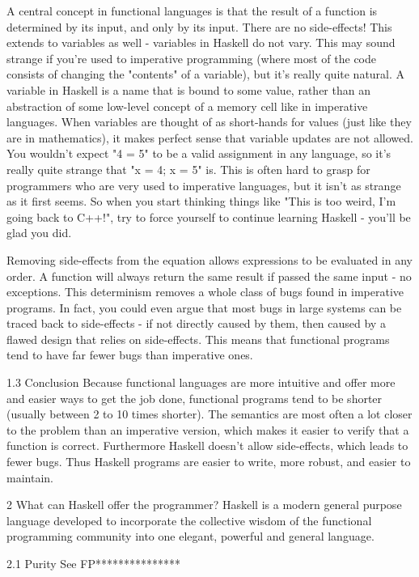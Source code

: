 \documentclass[main.tex]{subfiles}
\begin{document}
{{A central concept in functional languages is that the result of a function is determined by its input, and only by its input. There are no side-effects! This extends to variables as well - variables in Haskell do not vary. This may sound strange if you're used to imperative programming (where most of the code consists of changing the "contents" of a variable), but it's really quite natural. A variable in Haskell is a name that is bound to some value, rather than an abstraction of some low-level concept of a memory cell like in imperative languages. When variables are thought of as short-hands for values (just like they are in mathematics), it makes perfect sense that variable updates are not allowed. You wouldn't expect "4 = 5" to be a valid assignment in any language, so it's really quite strange that "x = 4; x = 5" is. This is often hard to grasp for programmers who are very used to imperative languages, but it isn't as strange as it first seems. So when you start thinking things like "This is too weird, I'm going back to C++!", try to force yourself to continue learning Haskell - you'll be glad you did.

Removing side-effects from the equation allows expressions to be evaluated in any order. A function will always return the same result if passed the same input - no exceptions. This determinism removes a whole class of bugs found in imperative programs. In fact, you could even argue that most bugs in large systems can be traced back to side-effects - if not directly caused by them, then caused by a flawed design that relies on side-effects. This means that functional programs tend to have far fewer bugs than imperative ones.

1.3 Conclusion
Because functional languages are more intuitive and offer more and easier ways to get the job done, functional programs tend to be shorter (usually between 2 to 10 times shorter). The semantics are most often a lot closer to the problem than an imperative version, which makes it easier to verify that a function is correct. Furthermore Haskell doesn't allow side-effects, which leads to fewer bugs. Thus Haskell programs are easier to write, more robust, and easier to maintain.

2 What can Haskell offer the programmer?
Haskell is a modern general purpose language developed to incorporate the collective wisdom of the functional programming community into one elegant, powerful and general language.

2.1 Purity
See FP***************

}}
\end{document}

